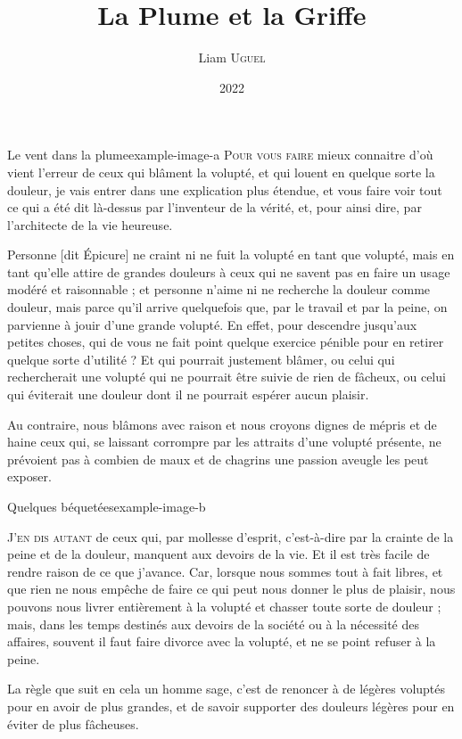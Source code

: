\documentclass[a5paper,10pt,twoside,openany,french]{book}
\author{Liam \textsc{Uguel}}
\title{La Plume et la Griffe}
\date{2022}
\begin{document}
  \frontmatter
  \maketitle

  \mainmatter


%
%
%

  \begin{liamchapter}{Le vent dans la plume}{example-image-a}
  \lettrine[lines=3]{P}{our vous faire} mieux connaitre d’où vient l’erreur de ceux qui blâment la volupté, et qui louent en quelque sorte la douleur, je vais entrer dans une explication plus étendue, et vous faire voir tout ce qui a été dit là-dessus par l’inventeur de la vérité, et, pour ainsi dire, par l’architecte de la vie heureuse.

  Personne [dit Épicure] ne craint ni ne fuit la volupté en tant que volupté, mais en tant qu’elle attire de grandes douleurs à ceux qui ne savent pas en faire un usage modéré et raisonnable ; et personne n’aime ni ne recherche la douleur comme douleur, mais parce qu’il arrive quelquefois que, par le travail et par la peine, on parvienne à jouir d’une grande volupté. En effet, pour descendre jusqu’aux petites choses, qui de vous ne fait point quelque exercice pénible pour en retirer quelque sorte d’utilité ? Et qui pourrait justement blâmer, ou celui qui rechercherait une volupté qui ne pourrait être suivie de rien de fâcheux, ou celui qui éviterait une douleur dont il ne pourrait espérer aucun plaisir.

  Au contraire, nous blâmons avec raison et nous croyons dignes de mépris et de haine ceux qui, se laissant corrompre par les attraits d’une volupté présente, ne prévoient pas à combien de maux et de chagrins une passion aveugle les peut exposer.
  \end{liamchapter}

  \begin{liamchapter}{Quelques béquetées}{example-image-b}

    \lettrine[lines=3]{J’}{en dis autant} de ceux qui, par mollesse d’esprit, c’est-à-dire par la crainte de la peine et de la douleur, manquent aux devoirs de la vie. Et il est très facile de rendre raison de ce que j’avance. Car, lorsque nous sommes tout à fait libres, et que rien ne nous empêche de faire ce qui peut nous donner le plus de plaisir, nous pouvons nous livrer entièrement à la volupté et chasser toute sorte de douleur ; mais, dans les temps destinés aux devoirs de la société ou à la nécessité des affaires, souvent il faut faire divorce avec la volupté, et ne se point refuser à la peine.

    La règle que suit en cela un homme sage, c’est de renoncer à de légères voluptés pour en avoir de plus grandes, et de savoir supporter des douleurs légères pour en éviter de plus fâcheuses.
  \end{liamchapter}






  \backmatter
\end{document}
